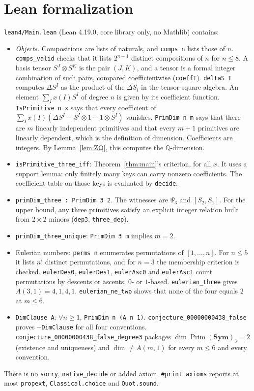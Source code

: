 \documentclass[11pt]{article}
\theoremstyle{remark}
\newcommand{\NSym}{\mathbf{Sym}}
\newcommand{\Prim}{\operatorname{Prim}}
\begin{document}
\section{Lean formalization}

\texttt{lean4/Main.lean} (Lean 4.19.0, core library only, no Mathlib) contains:
\begin{itemize}
\item \emph{Objects.} Compositions are lists of naturals, and \texttt{comps n} lists those of $n$.
\texttt{comps\_valid} checks that it lists $2^{n-1}$ distinct compositions of $n$ for $n\le8$.
A basis tensor $S^J\otimes S^K$ is the pair $(J,K)$, and a tensor is a formal integer
combination of such pairs, compared coefficientwise (\texttt{coeffT}).
\texttt{deltaS I} computes $\Delta S^I$ as the product of the $\Delta S_{i}$ in the
tensor-square algebra. An element $\sum_I x(I)S^I$ of degree $n$ is given by its coefficient
function. \texttt{IsPrimitive n x} says that every coefficient of
$\sum_I x(I)(\Delta S^I-S^I\otimes1-1\otimes S^I)$ vanishes. \texttt{PrimDim n m} says
that there are $m$ linearly independent primitives and that every $m+1$ primitives
are linearly dependent, which is the definition of dimension. Coefficients are integers. By Lemma~\ref{lem:ZQ}, this computes the $\mathbb Q$-dimension.
\item \texttt{isPrimitive\_three\_iff}: Theorem~\ref{thm:main}'s criterion, for all $x$.
It uses a support lemma: only finitely many keys can carry nonzero coefficients.
The coefficient table on those keys is evaluated by \texttt{decide}.
\item \texttt{primDim\_three : PrimDim 3 2}. The witnesses are $\Psi_3$ and $[S_2,S_1]$.
For the upper bound, any three primitives satisfy an explicit integer relation built from
$2\times2$ minors (\texttt{dep3}, \texttt{three\_dep}).
\item \texttt{primDim\_three\_unique}: \texttt{PrimDim 3 m} implies $m=2$.
\item Eulerian numbers: \texttt{perms n} enumerates permutations of $[1,\dots,n]$. For $n\le5$
it lists $n!$ distinct permutations, and for $n=3$ the membership criterion is checked.
\texttt{eulerDes0}, \texttt{eulerDes1}, \texttt{eulerAsc0} and \texttt{eulerAsc1}
count permutations by descents or ascents, $0$- or $1$-based.
\texttt{eulerian\_three} gives $A(3,1)=4,1,4,1$.
\texttt{eulerian\_ne\_two} shows that none of the four equals $2$ at $m\le6$.
\item \texttt{DimClause A}: $\forall n\ge1$, \texttt{PrimDim n (A n 1)}.
\texttt{conjecture\_00000000438\_false} proves $\neg$\texttt{DimClause} for all four
conventions. \texttt{conjecture\_00000000438\_false\_degree3} packages
$\dim\Prim(\NSym)_3=2$ (existence and uniqueness) and $\dim\ne A(m,1)$ for every
$m\le6$ and every convention.
\end{itemize}
There is no \texttt{sorry}, \texttt{native\_decide} or added axiom. \texttt{\#print axioms}
reports at most \texttt{propext}, \texttt{Classical.choice} and \texttt{Quot.sound}.
\end{document}
